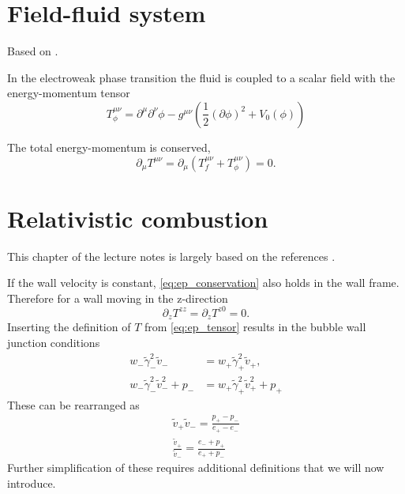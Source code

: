 \section{Field-fluid system}
Based on \cite{moore_pt_1995}.

In the electroweak phase transition the fluid is coupled to a scalar field with the energy-momentum tensor
\cites[eq. 2.9]{hindmarsh_gw_pt_2019}
\begin{equation}
T_\phi^{\mu \nu}
= \partial^\mu \partial^\nu \phi
- g^{\mu \nu} \left(\frac{1}{2} (\partial \phi)^2 + V_0 (\phi) \right)
\end{equation}

The total energy-momentum is conserved,
\cite[eq. 5.17]{lecture_notes}
\begin{equation}
\partial_\mu T^{\mu \nu} = \partial_\mu (T_f^{\mu \nu} + T_\phi^{\mu \nu}) = 0.
\label{eq:ep_conservation}
\end{equation}



\section{Relativistic combustion}
This chapter of the lecture notes is largely based on the references
\cites{hindmarsh_gw_pt_2019}{espinosa_energy_2010}.

If the wall velocity is constant, \eqref{eq:ep_conservation} also holds in the wall frame.
Therefore for a wall moving in the z-direction
\cite[eq. 7]{espinosa_energy_2010}
\begin{equation}
\partial_z T^{zz} = \partial_z T^{z0} = 0.
\end{equation}
Inserting the definition of $T$ from \eqref{eq:ep_tensor} results in the bubble wall junction conditions
\cites[eq. 7.22]{lecture_notes}[eq. B.2-3]{hindmarsh_gw_pt_2019}
\begin{align}
w_- \tilde{\gamma}_-^2 \tilde{v}_- &= w_+ \tilde{\gamma}_+^2 \tilde{v}_+, \\
w_- \tilde{\gamma}_-^2 \tilde{v}_-^2 + p_- &= w_+ \tilde{\gamma}_+^2 \tilde{v}_+^2 + p_+
\end{align}
These can be rearranged as
\cites[eq. 7.32]{lecture_notes}[eq. 6-7]{giese_2020}
\begin{align}
\tilde{v}_+ \tilde{v}_- = \frac{p_+ - p_-}{e_+ - e_-} \\
\frac{\tilde{v}_+}{\tilde{v}_-} = \frac{e_- + p_+}{e_+ + p_-}
\label{eq:junction_ep}
\end{align}
Further simplification of these requires additional definitions
that we will now introduce.


